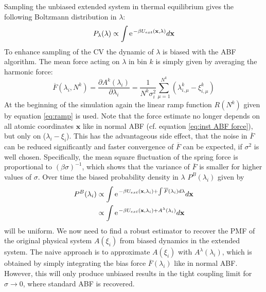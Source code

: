 Sampling the unbiased extended system in thermal equilibrium gives the following Boltzmann distribution in $\lambda$:
\begin{equation}
  P_\lambda(\lambda) \propto \int \e^{-\beta U_{ext}(\textbf{x},\lambda)} d\textbf{x} \\
\end{equation}
To enhance sampling of the CV the dynamic of $\lambda$ is biased with the ABF algorithm.
The mean force acting on $\lambda$ in bin $k$ is simply given by averaging the harmonic force:
\begin{equation}
  \overline{F}(\lambda_{i}, N^k) = \frac{\partial A^{k}(\lambda_{i})}{\partial \lambda_i} = \frac{1}{N^{k}\sigma_i^2} \sum_{\mu=1}^{N^{k}} (\lambda_{i,\mu}^{k}-\xi_{i,\mu}^{k})
  \label{eq:eABF bias}
\end{equation}
At the beginning of the simulation again the linear ramp function $R(N^k)$ given by equation \ref{eq:ramp} is used.
Note that the force estimate no longer depends on all atomic coordinates $\textbf{x}$ like in normal ABF (cf. equation \ref{eq:inst ABF force}), but only on ($\lambda_i - \xi_i$).
This has the advantageous side effect, that the noise in $\overline{F}$ can be reduced significantly and faster convergence of $\overline{F}$ can be expected, if $\sigma^2$ is well chosen.\autocite{lesage2017smoothed} Specifically, the mean square fluctuation of the spring force is proportional to $(\beta\sigma)^{-1}$, which shows that the variance of $\overline{F}$ is smaller for higher values of $\sigma$.
Over time the biased probability density in $\lambda$ $P^B(\lambda_i)$ given by
\begin{equation}
  \begin{split}
  P^B(\lambda_i) &\propto \int \e^{-\beta U_{ext}(\textbf{x},\lambda_i) +\int \overline{F}(\lambda_{i})d\lambda} d\textbf{x} \\
  &\propto \int \e^{-\beta U_{ext}(\textbf{x},\lambda_i) +A^\lambda(\lambda_{i})} d\textbf{x}
  \end{split}
\end{equation}
will be uniform.
We now need to find a robust estimator to recover the PMF of the original physical system $A(\xi_i)$ from biased dynamics in the extended system.
The naive approach is to approximate $A(\xi_i)$ with $A^\lambda(\lambda_i)$, which is obtained by simply integrating the bias force $\overline{F}(\lambda_{i})$ like in normal ABF.
However, this will only produce unbiased results in the tight coupling limit for $\sigma \rightarrow 0$, where standard ABF is recovered.

